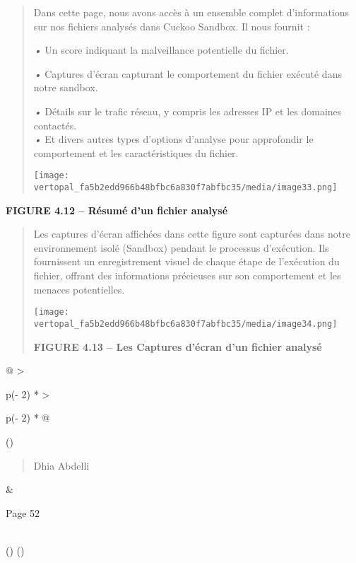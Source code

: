 \documentclass[
]{article}
\begin{document}
\begin{quote}
Dans cette page, nous avons accès à un ensemble complet d'informations
sur nos fichiers analysés dans Cuckoo Sandbox. Il nous fournit :

\emph{•} Un score indiquant la malveillance potentielle du fichier.

\emph{•} Captures d'écran capturant le comportement du fichier exécuté
dans notre sandbox.

\emph{•} Détails sur le trafic réseau, y compris les adresses IP et les
domaines contactés.\\
\emph{•} Et divers autres types d'options d'analyse pour approfondir le
comportement et les caractéristiques du fichier.

\texttt{[image: vertopal\_fa5b2edd966b48bfbc6a830f7abfbc35/media/image33.png]}
\end{quote}

\textbf{FIGURE 4.12 -- Résumé d'un fichier analysé}

\begin{quote}
Les captures d'écran affichées dans cette figure sont capturées dans
notre environnement isolé (Sandbox) pendant le processus d'exécution.
Ils fournissent un enregistrement visuel de chaque étape de l'exécution
du fichier, offrant des informations précieuses sur son comportement et
les menaces potentielles.

\texttt{[image: vertopal\_fa5b2edd966b48bfbc6a830f7abfbc35/media/image34.png]}

\textbf{FIGURE 4.13 -- Les Captures d'écran d'un fichier analysé}
\end{quote}

\begin{longtable}[]{@{}
  >{\raggedright\arraybackslash}p{(\columnwidth - 2\tabcolsep) * }
  >{\raggedright\arraybackslash}p{(\columnwidth - 2\tabcolsep) * }@{}}
\toprule()
\begin{minipage}[b]{\linewidth}\raggedright
\begin{quote}
Dhia Abdelli
\end{quote}
\end{minipage} & \begin{minipage}[b]{\linewidth}\raggedright
Page 52
\end{minipage} \\
\midrule()
\endhead
\bottomrule()
\end{longtable}
\end{document}

